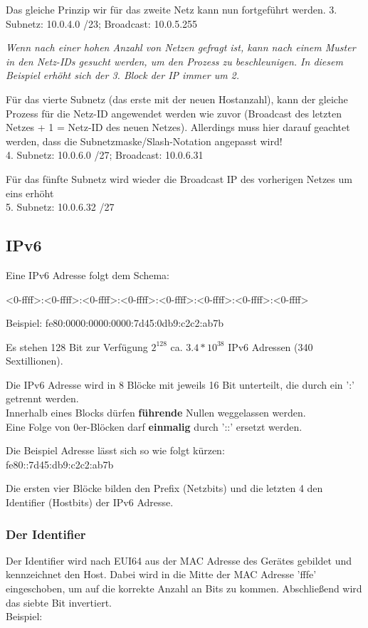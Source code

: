 \documentclass[asp1.tex]{subfiles}
\begin{document}
Das gleiche Prinzip wir für das zweite Netz kann nun fortgeführt werden.
3. Subnetz: 10.0.4.0 /23; Broadcast: 10.0.5.255

\textit{Wenn nach einer hohen Anzahl von Netzen gefragt ist, kann nach einem Muster in den Netz-IDs gesucht werden, um den Prozess zu beschleunigen. In diesem Beispiel erhöht sich der 3. Block der IP immer um 2.}

Für das vierte Subnetz (das erste mit der neuen Hostanzahl), kann der gleiche Prozess für die Netz-ID angewendet werden wie zuvor (Broadcast des letzten Netzes + 1 = Netz-ID des neuen Netzes). Allerdings muss hier darauf geachtet werden, dass die Subnetzmaske/Slash-Notation angepasst wird!\\
4. Subnetz: 10.0.6.0 /27; Broadcast: 10.0.6.31

Für das fünfte Subnetz wird wieder die Broadcast IP des vorherigen Netzes um eins erhöht\\
5. Subnetz: 10.0.6.32 /27


\break
\subsection{IPv6}

Eine IPv6 Adresse folgt dem Schema:

\textless0-ffff\textgreater:\textless0-ffff\textgreater:\textless0-ffff\textgreater:\textless0-ffff\textgreater:\textless0-ffff\textgreater:\textless0-ffff\textgreater:\textless0-ffff\textgreater:\textless0-ffff\textgreater

Beispiel: fe80:0000:0000:0000:7d45:0db9:c2c2:ab7b

Es stehen 128 Bit zur Verfügung \textrightarrow\space \(2^{128}\) \textrightarrow\space ca. \(3.4 * 10^{38}\) IPv6 Adressen (340 Sextillionen).

Die IPv6 Adresse wird in 8 Blöcke mit jeweils 16 Bit unterteilt, die durch ein ':' getrennt werden.\\
Innerhalb eines Blocks dürfen \textbf{führende} Nullen weggelassen werden.\\
Eine Folge von 0er-Blöcken darf \textbf{einmalig} durch '::' ersetzt werden.

Die Beispiel Adresse lässt sich so wie folgt kürzen:\\
fe80::7d45:db9:c2c2:ab7b

Die ersten vier Blöcke bilden den Prefix (Netzbits) und die letzten 4 den Identifier (Hostbits) der IPv6 Adresse.

\subsubsection{Der Identifier}
Der Identifier wird nach EUI64 aus der MAC Adresse des Gerätes gebildet und kennzeichnet den Host. Dabei wird in die Mitte der MAC Adresse 'fffe' eingeschoben, um auf die korrekte Anzahl an Bits zu kommen. Abschließend wird das siebte Bit invertiert.\\
Beispiel:
\end{document}
